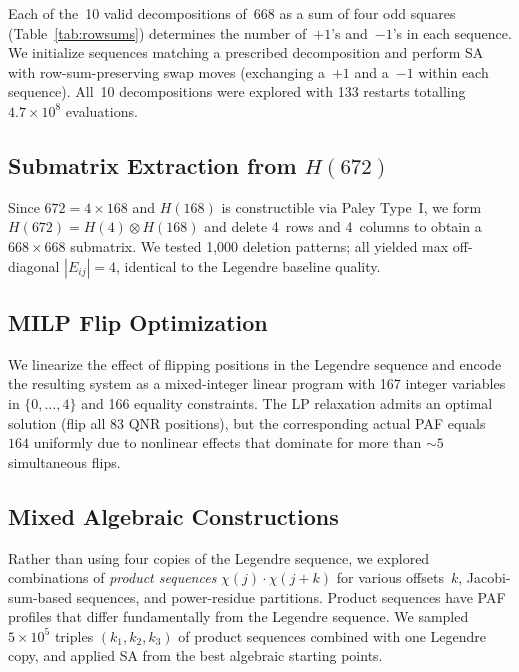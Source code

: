 \documentclass[11pt,a4paper]{article}
\begin{document}
Each of the~10 valid decompositions of~668 as a sum of four odd squares
(Table~\ref{tab:rowsums}) determines the number of~$+1$'s and~$-1$'s in
each sequence.  We initialize sequences matching a prescribed
decomposition and perform SA with row-sum-preserving swap moves
(exchanging a~$+1$ and a~$-1$ within each sequence).  All~10
decompositions were explored with 133 restarts totalling $4.7 \times 10^8$
evaluations.

\subsection{Submatrix Extraction from \texorpdfstring{$H(672)$}{H(672)}}

Since $672 = 4 \times 168$ and $H(168)$ is constructible via Paley Type~I,
we form $H(672) = H(4) \otimes H(168)$ and delete 4~rows and 4~columns to
obtain a $668 \times 668$ submatrix.  We tested 1{,}000 deletion patterns;
all yielded max off-diagonal $|E_{ij}| = 4$, identical to the Legendre
baseline quality.

\subsection{MILP Flip Optimization}

We linearize the effect of flipping positions in the Legendre sequence and
encode the resulting system as a mixed-integer linear program with 167
integer variables in $\{0,\ldots,4\}$ and 166 equality constraints.
The LP relaxation admits an optimal solution (flip all 83 QNR positions),
but the corresponding actual PAF equals~$164$ uniformly due to nonlinear
effects that dominate for more than $\sim\!5$ simultaneous flips.

\subsection{Mixed Algebraic Constructions}\label{sec:method:algebraic}

Rather than using four copies of the Legendre sequence, we explored
combinations of \emph{product sequences} $\chi(j) \cdot \chi(j+k)$ for
various offsets~$k$, Jacobi-sum-based sequences, and power-residue
partitions.  Product sequences have PAF profiles that differ fundamentally
from the Legendre sequence.  We sampled $5 \times 10^5$ triples
$(k_1,k_2,k_3)$ of product sequences combined with one Legendre copy, and
applied SA from the best algebraic starting points.

\end{document}
